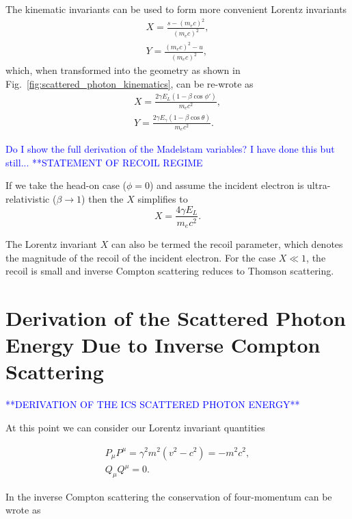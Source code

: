 \documentclass[../main.tex]{subfiles}
\begin{document}
The kinematic invariants can be used to form more convenient Lorentz invariants
\begin{align}
X = \frac{s-\left(m_{e}c\right)^{2}}{\left(m_{e}c\right)^{2}},
\label{eq:X_Mandelstam} \\
Y = \frac{\left(m_{e}c\right)^{2}-u}{\left(m_{e}c\right)^{2}},
\label{eq:Y_Mandelstam}
\end{align}
which, when transformed into the geometry as shown in Fig.~\ref{fig:scattered_photon_kinematics}, can be re-wrote as
\begin{align}
X = \frac{2\gamma E_{L}\left(1-\beta\cos\phi'\right)}{m_{e}c^{2}},
\label{eq:X_geometry} \\
Y = \frac{2\gamma E_{\gamma}\left(1-\beta\cos\theta\right)}{m_{e}c^{2}}.
\label{eq:Y_geometry}
\end{align}

\textcolor{blue}{Do I show the full derivation of the Madelstam variables? I have done this but still...}
\textcolor{blue}{**STATEMENT OF RECOIL REGIME}

If we take the head-on case ($\phi = 0$) and  assume the incident electron is ultra-relativistic ($\beta \rightarrow 1$) then the $X$ simplifies to 
\begin{equation}
X = \frac{4\gamma E_{L}}{m_{e}c^{2}}.
\label{eq:X_headon}
\end{equation}

The Lorentz invariant $X$ can also be termed the recoil parameter, which denotes the magnitude of the recoil of the incident electron. For the case $X \ll 1$, the recoil is small and inverse Compton scattering reduces to Thomson scattering.    

\section{Derivation of the Scattered Photon Energy Due to Inverse Compton Scattering}

\textcolor{blue}{**DERIVATION OF THE ICS SCATTERED PHOTON ENERGY**}

At this point we can consider our Lorentz invariant quantities 

\begin{align}
P_{\mu}P^{\mu} = \gamma^{2}m^{2}\left(v^{2}-c^{2}\right) = -m^{2}c^{2},
\label{eq:lorentz_invariants1} \\
Q_{\mu}Q^{\mu} = 0.
\label{eq:lorentz_invariants2}
\end{align}

In the inverse Compton scattering the conservation of four-momentum can be wrote as
\end{document}
